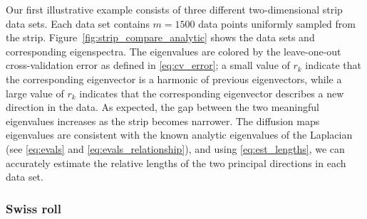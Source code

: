\documentclass[preprint]{elsarticle}
\begin{document}
Our first illustrative example consists of three different two-dimensional strip data sets. 
%
Each data set contains $m=1500$ data points uniformly sampled from the strip. 
%
Figure~\ref{fig:strip_compare_analytic} shows the data sets and corresponding eigenspectra.
%
The eigenvalues are colored by the leave-one-out cross-validation error as defined in \eqref{eq:cv_error}; a small value of $r_k$ indicate that the corresponding eigenvector is a harmonic of previous eigenvectors, while a large value of $r_k$ indicates that the corresponding eigenvector describes a new direction in the data. 
%
As expected, the gap between the two meaningful eigenvalues increases as the strip becomes narrower. 
%
The diffusion maps eigenvalues are consistent with the known analytic eigenvalues of the Laplacian (see \eqref{eq:evals} and \eqref{eq:evals_relationship}), and using \eqref{eq:est_lengths}, we can accurately estimate the relative lengths of the two principal directions in each data set. 


\subsubsection{Swiss roll}
\end{document}
